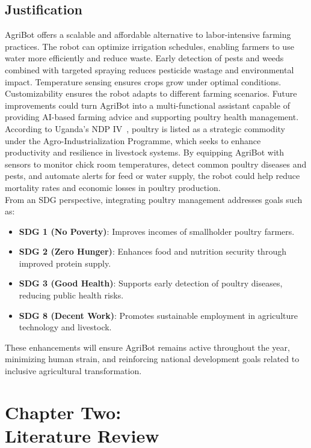 \documentclass[12pt,a4paper]{report}
\begin{document}
\section{Justification}
AgriBot offers a scalable and affordable alternative to labor-intensive farming practices. The robot can optimize irrigation schedules, enabling farmers to use water more efficiently and reduce waste. Early detection of pests and weeds combined with targeted spraying reduces pesticide wastage and environmental impact. Temperature sensing ensures crops grow under optimal conditions. Customizability ensures the robot adapts to different farming scenarios. Future improvements could turn AgriBot into a multi-functional assistant capable of providing AI-based farming advice and supporting poultry health management. According to Uganda’s NDP IV~\cite{uganda2024ndpiv}, poultry is listed as a strategic commodity under the Agro-Industrialization Programme, which seeks to enhance productivity and resilience in livestock systems. By equipping AgriBot with sensors to monitor chick room temperatures, detect common poultry diseases and pests, and automate alerts for feed or water supply, the robot could help reduce mortality rates and economic losses in poultry production.\\
From an SDG perspective, integrating poultry management addresses goals such as:
\begin{itemize}
    \item \textbf{SDG 1 (No Poverty)}: Improves incomes of smallholder poultry farmers.
    \item \textbf{SDG 2 (Zero Hunger)}: Enhances food and nutrition security through improved protein supply.
    \item \textbf{SDG 3 (Good Health)}: Supports early detection of poultry diseases, reducing public health risks.
    \item \textbf{SDG 8 (Decent Work)}: Promotes sustainable employment in agriculture technology and livestock.
\end{itemize}

These enhancements will ensure AgriBot remains active throughout the year, \\minimizing human strain, and reinforcing national development goals related to inclusive agricultural transformation.

\chapter{Chapter Two: \\Literature Review}
\end{document}
